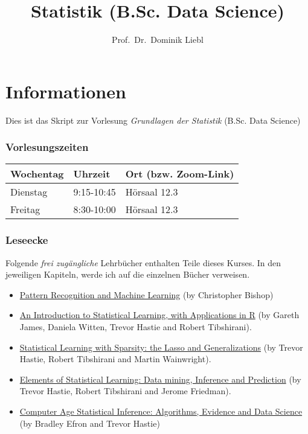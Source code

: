 \documentclass[
]{book}
\title{Statistik (B.Sc. Data Science)}
\author{Prof.~Dr.~Dominik Liebl}
\date{}
\begin{document}
\maketitle

{
\setcounter{tocdepth}{1}
\tableofcontents
}
\hypertarget{informationen}{%
\chapter*{Informationen}\label{informationen}}

Dies ist das Skript zur Vorlesung \emph{Grundlagen der Statistik} (B.Sc. Data Science)

\hypertarget{vorlesungszeiten}{%
\subsection*{Vorlesungszeiten}\label{vorlesungszeiten}}

\begin{table}[H]
\centering
\begin{tabular}[t]{l|l|l}
\hline
Wochentag & Uhrzeit & Ort (bzw. Zoom-Link)\\
\hline
Dienstag & 9:15-10:45 & Hörsaal 12.3\\
\hline
Freitag & 8:30-10:00 & Hörsaal 12.3\\
\hline
\end{tabular}
\end{table}

\hypertarget{leseecke}{%
\subsection*{Leseecke}\label{leseecke}}

Folgende \emph{frei zugängliche} Lehrbücher enthalten Teile dieses Kurses. In den jeweiligen Kapiteln, werde ich auf die einzelnen Bücher verweisen.

\begin{itemize}
\item
  \href{https://www.microsoft.com/en-us/research/uploads/prod/2006/01/Bishop-Pattern-Recognition-and-Machine-Learning-2006.pdf}{Pattern Recognition and Machine Learning} (by Christopher Bishop)
\item
  \href{https://trevorhastie.github.io/ISLR/}{An Introduction to Statistical Learning, with Applications in R} (by Gareth James, Daniela Witten, Trevor Hastie and Robert Tibshirani).
\item
  \href{https://web.stanford.edu/~hastie/StatLearnSparsity/}{Statistical Learning with Sparsity: the Lasso and Generalizations} (by Trevor Hastie, Robert Tibshirani and Martin Wainwright).
\item
  \href{https://web.stanford.edu/~hastie/ElemStatLearn/}{Elements of Statistical Learning: Data mining, Inference and Prediction} (by Trevor Hastie, Robert Tibshirani and Jerome Friedman).
\item
  \href{https://web.stanford.edu/~hastie/CASI/}{Computer Age Statistical Inference: Algorithms, Evidence and Data Science} (by Bradley Efron and Trevor Hastie)
\end{itemize}
\end{document}
